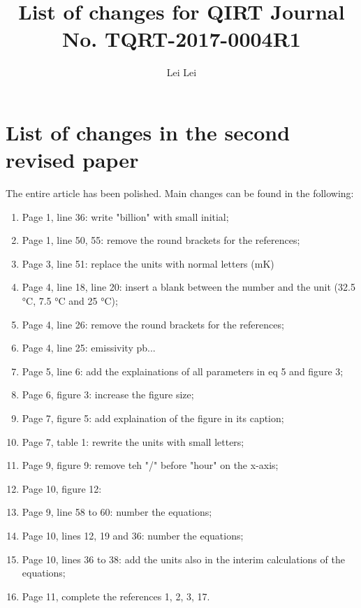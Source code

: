\documentclass{article}
\begin{document}
    
\title{List of changes for QIRT Journal No. TQRT-2017-0004R1}
\author{Lei Lei}

\maketitle

\section{List of changes in the second revised paper} %
The entire article has been polished. Main changes can be found in the following:
\begin{enumerate}
    \item Page 1, line 36: write "billion" with small initial; 
    \item Page 1, line 50, 55: remove the round brackets for the references;
    \item Page 3, line 51: replace the units with normal letters (mK)
    \item Page 4, line 18, line 20: insert a blank between the number and the unit (32.5 °C, 7.5 °C and 25 °C);
    \item Page 4, line 26: remove the round brackets for the references;
    \item Page 4, line 25: emissivity pb...
    \item Page 5, line 6: add the explainations of all parameters in eq 5 and figure 3;
    \item Page 6, figure 3: increase the figure size;
    \item Page 7, figure 5: add explaination of the figure in its caption;
    \item Page 7, table 1: rewrite the units with small letters;
    \item Page 9, figure 9: remove teh "/" before "hour" on the x-axis;
    \item Page 10, figure 12:
    \item Page 9, line 58 to 60: number the equations;
    \item Page 10, lines 12, 19 and 36: number the equations;
    \item Page 10, lines 36 to 38: add the units also in the interim calculations of the equations;
    \item Page 11, complete the references 1, 2, 3, 17.
\end{enumerate}
\end{document}
